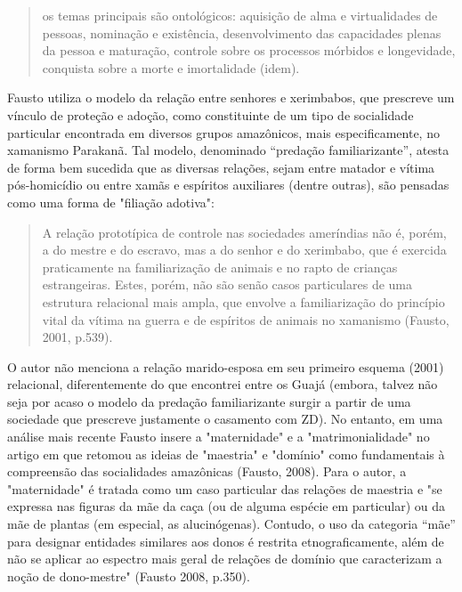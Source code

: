 \begin{quote}
os temas principais são ontológicos: aquisição de alma e virtualidades
de pessoas, nominação e existência, desenvolvimento das capacidades
plenas da pessoa e maturação, controle sobre os processos mórbidos e
longevidade, conquista sobre a morte e imortalidade (idem).
\end{quote}

Fausto utiliza o modelo da relação entre senhores e xerimbabos, que
prescreve um vínculo de proteção e adoção, como constituinte de um tipo
de socialidade particular encontrada em diversos grupos amazônicos, mais
especificamente, no xamanismo Parakanã. Tal modelo, denominado
``predação familiarizante'', atesta de forma bem sucedida que as
diversas relações, sejam entre matador e vítima pós-homicídio ou entre
xamãs e espíritos auxiliares (dentre outras), são pensadas como uma
forma de "filiação adotiva":

\begin{quote}
A relação prototípica de controle nas sociedades ameríndias não é,
porém, a do mestre e do escravo, mas a do senhor e do xerimbabo, que é
exercida praticamente na familiarização de animais e no rapto de
crianças estrangeiras. Estes, porém, não são senão casos particulares de
uma estrutura relacional mais ampla, que envolve a familiarização do
princípio vital da vítima na guerra e de espíritos de animais no
xamanismo (Fausto, 2001, p.539).
\end{quote}

O autor não menciona a relação marido-esposa em seu primeiro esquema
(2001) relacional, diferentemente do que encontrei entre os Guajá
(embora, talvez não seja por acaso o modelo da predação familiarizante
surgir a partir de uma sociedade que prescreve justamente o casamento
com ZD). No entanto, em uma análise mais recente Fausto insere a
"maternidade" e a "matrimonialidade" no artigo em que retomou as ideias
de "maestria" e "domínio" como fundamentais à compreensão das
socialidades amazônicas (Fausto, 2008). Para o autor, a "maternidade" é
tratada como um caso particular das relações de maestria e "se expressa
nas figuras da mãe da caça (ou de alguma espécie em particular) ou da
mãe de plantas (em especial, as alucinógenas). Contudo, o uso da
categoria ``mãe'' para designar entidades similares aos donos é restrita
etnograficamente, além de não se aplicar ao espectro mais geral de
relações de domínio que caracterizam a noção de dono-mestre" (Fausto
2008, p.350).


